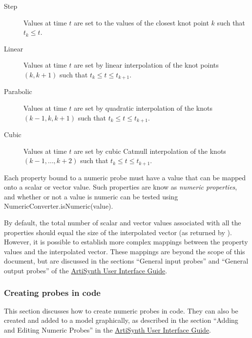 \begin{description}

\item[Step]\mbox{}

Values at time $t$ are set to the values of the closest knot point
$k$ such that $t_k \le t$.

\item[Linear]\mbox{}

Values at time $t$ are set by linear interpolation of the knot points
$(k, k+1)$ such that $t_k \le t \le t_{k+1}$.

\item[Parabolic]\mbox{}

Values at time $t$ are set by quadratic interpolation of the knots
$(k-1, k, k+1)$ such that $t_k \le t \le t_{k+1}$.

\item[Cubic]\mbox{}

Values at time $t$ are set by cubic Catmull interpolation of the knots
$(k-1, \ldots, k+2)$ such that $t_k \le t \le t_{k+1}$.

\end{description}

Each property bound to a numeric probe must have a value
that can be mapped onto a scalar or vector value. Such properties
are know as {\it numeric properties}, and whether or not
a value is numeric can be tested
using %
{NumericConverter.isNumeric(value)}.

By default, the total number of scalar and vector values associated
with all the properties should equal the size of the interpolated
vector (as returned by
).
However, it is possible to establish more complex mappings between the
property values and the interpolated vector. These mappings are beyond
the scope of this document, but are discussed in the sections ``General
input probes'' and ``General output probes'' of the
\href{../uiguide/uiguide.html}{
ArtiSynth User Interface Guide}.

\subsubsection{Creating probes in code}

This section discusses how to create numeric probes in code.  They can
also be created and added to a model graphically, as described in the
section ``Adding and Editing Numeric Probes'' in the
\href{../uiguide/uiguide.html}{
ArtiSynth User Interface Guide}.

